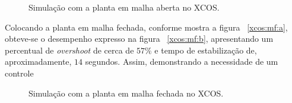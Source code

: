 \begin{figure}[H]
\begin{center}
\end{center}
\caption{Simulação com a planta em malha aberta no XCOS.}
\label{xcos:ma} 
\end{figure}

Colocando a planta em malha fechada, conforme mostra a figura ~\ref{xcos:mf:a}, obteve-se o desempenho expresso na figura ~\ref{xcos:mf:b}, apresentando um percentual de \textit{overshoot} de cerca de $57\%$ e tempo de estabilização de, aproximadamente, $14$ segundos. Assim, demonstrando a necessidade de um controle

\begin{figure}[H]
\begin{center}
\end{center}
\caption{Simulação com a planta em malha fechada no XCOS.}
\label{xcos:mf} 
\end{figure}

